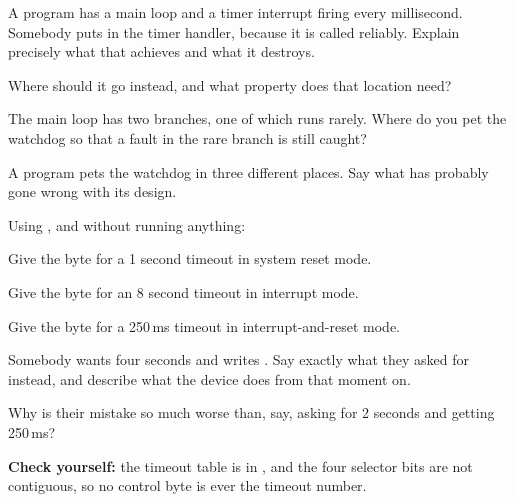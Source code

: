 \label{c6:ex:pet}
\begin{parts}
  \item A program has a main loop and a timer interrupt firing every millisecond. Somebody puts
     in the timer handler, because it is called reliably. Explain precisely
    what that achieves and what it destroys.
  \item Where should it go instead, and what property does that location need?
  \item The main loop has two branches, one of which runs rarely. Where do you pet the watchdog so
    that a fault in the rare branch is still caught?
  \item A program pets the watchdog in three different places. Say what has probably gone wrong
    with its design.
\end{parts}

\label{c6:ex:bytes}
Using , and without running anything:
\begin{parts}
  \item Give the byte for a 1 second timeout in system reset mode.
  \item Give the byte for an 8 second timeout in interrupt mode.
  \item Give the byte for a 250\,ms timeout in interrupt-and-reset mode.
  \item Somebody wants four seconds and writes . Say exactly what they asked for
    instead, and describe what the device does from that moment on.
  \item Why is their mistake so much worse than, say, asking for 2 seconds and getting 250\,ms?
\end{parts}

\noindent\textbf{Check yourself:} the timeout table is in , and the four
selector bits are not contiguous, so no control byte is ever the timeout number.

